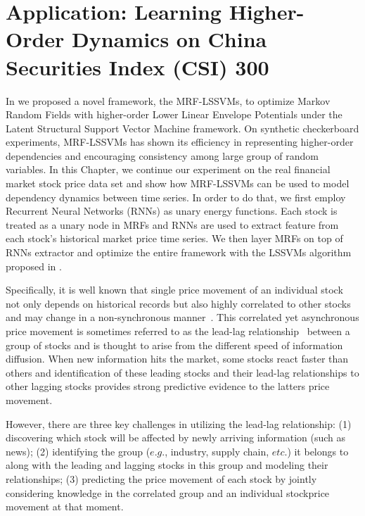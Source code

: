
\chapter{Application: Learning Higher-Order Dynamics on China
  Securities Index (CSI) 300}
\label{cha:mrf_lssvm_app}

In  we proposed a novel framework, the
MRF-LSSVMs, to optimize Markov Random Fields with higher-order
Lower Linear Envelope Potentials under the Latent Structural
Support Vector Machine framework. On synthetic checkerboard
experiments, MRF-LSSVMs has shown its efficiency in representing
higher-order dependencies and encouraging consistency among large
group of random variables. In this Chapter, we continue our
experiment on the real financial market stock price data set and
show how MRF-LSSVMs can be used to model dependency dynamics
between time series. In order to do that, we first employ
Recurrent Neural Networks (RNNs) as unary energy functions. Each
stock is treated as a unary node in MRFs and RNNs are used to
extract feature from each stock's historical market price time
series. We then layer MRFs on top of RNNs extractor and optimize
the entire framework with the LSSVMs algorithm proposed in
.

Specifically, it is well known that single price movement of an
individual stock not only depends on historical records but also
highly correlated to other
stocks~\cite{lo1990contrarian,mech1993portfolio} and may change
in a non-synchronous
manner~\cite{lo1990contrarian,brennan1993investment}. This
correlated yet asynchronous price movement is sometimes referred
to as the lead-lag relationship~\cite{hou2007industry} between a
group of stocks and is thought to arise from the different speed
of information
diffusion\cite{lo1990contrarian,badrinath1995shepherds,mcqueen1996delayed}.
When new information hits the market, some stocks react faster
than others and identification of these leading stocks and their
lead-lag relationships to other lagging stocks provides strong
predictive evidence to the latter\textquotesingle s price
movement.

However, there are three key challenges in utilizing the lead-lag
relationship: (1) discovering which stock will be affected by
newly arriving information (such as news); (2) identifying the
group ($e.g.$, industry, supply chain, $etc.$) it belongs to
along with the leading and lagging stocks in this group and
modeling their relationships; (3) predicting the price movement
of each stock by jointly considering knowledge in the correlated
group and an individual stock\textquotesingle price movement at
that moment.

